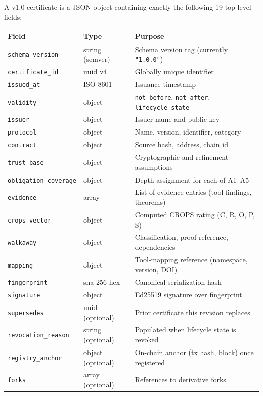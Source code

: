 \documentclass[11pt,a4paper]{article}
\begin{document}
A v1.0 certificate is a JSON object containing exactly the following 19 top-level fields:

\begin{center}
\begin{tabular}{lll}
\toprule
\textbf{Field} & \textbf{Type} & \textbf{Purpose} \\
\midrule
\texttt{schema\_version}      & string (semver)   & Schema version tag (currently \texttt{"1.0.0"}) \\
\texttt{certificate\_id}      & uuid v4           & Globally unique identifier \\
\texttt{issued\_at}           & ISO 8601          & Issuance timestamp \\
\texttt{validity}             & object            & \texttt{not\_before}, \texttt{not\_after}, \texttt{lifecycle\_state} \\
\texttt{issuer}               & object            & Issuer name and public key \\
\texttt{protocol}             & object            & Name, version, identifier, category \\
\texttt{contract}             & object            & Source hash, address, chain id \\
\texttt{trust\_base}          & object            & Cryptographic and refinement assumptions \\
\texttt{obligation\_coverage} & object            & Depth assignment for each of A1--A5 \\
\texttt{evidence}             & array             & List of evidence entries (tool findings, theorems) \\
\texttt{crops\_vector}        & object            & Computed CROPS rating (C, R, O, P, S) \\
\texttt{walkaway}             & object            & Classification, proof reference, dependencies \\
\texttt{mapping}              & object            & Tool-mapping reference (namespace, version, DOI) \\
\texttt{fingerprint}          & sha-256 hex       & Canonical-serialization hash \\
\texttt{signature}            & object            & Ed25519 signature over fingerprint \\
\texttt{supersedes}           & uuid (optional)   & Prior certificate this revision replaces \\
\texttt{revocation\_reason}   & string (optional) & Populated when lifecycle state is revoked \\
\texttt{registry\_anchor}     & object (optional) & On-chain anchor (tx hash, block) once registered \\
\texttt{forks}                & array (optional)  & References to derivative forks \\
\bottomrule
\end{tabular}
\end{center}
\end{document}
